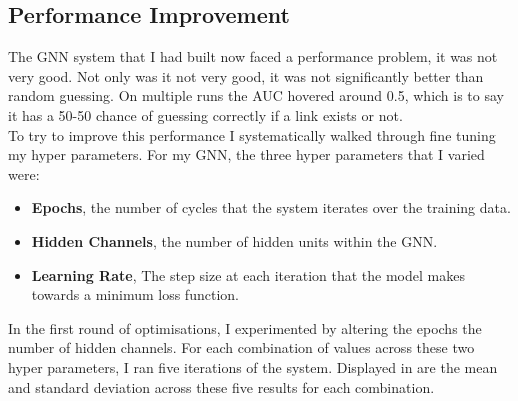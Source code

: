 \documentclass{l4proj}
\begin{document}
\subsection{Performance Improvement}

The GNN system that I had built now faced a performance problem, it was not very good. Not only was it not very good, it was not significantly better than random guessing. On multiple runs the AUC hovered around 0.5, which is to say it has a 50-50 chance of guessing correctly if a link exists or not. \\

To try to improve this performance I systematically walked through fine tuning my hyper parameters. For my GNN, the three hyper parameters that I varied were:
\\
\begin{itemize}
    \item \textbf{Epochs}, the number of cycles that the system iterates over the training data.
    \item \textbf{Hidden Channels}, the number of hidden units within the GNN.
    \item \textbf{Learning Rate}, The step size at each iteration that the model makes towards a minimum loss function.\\
\end{itemize}

In the first round of optimisations, I experimented by altering the epochs the number of hidden channels. For each combination of values across these two hyper parameters, I ran five iterations of the system. Displayed in  are the mean and standard deviation across these five results for each combination. \\
\end{document}
